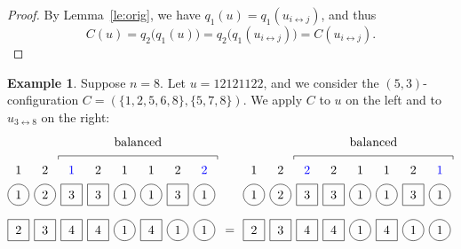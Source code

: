 \documentclass[reqno]{amsart}
\newcommand{\0}{\phantom{c}}
\theoremstyle{plain}
\theoremstyle{definition}
\newtheorem{example}[thm]{Example}
\numberwithin{equation}{section}
\begin{document}
\begin{proof}
  By Lemma~\ref{le:orig}, we have $q_1(u) = q_1(u_{i\leftrightarrow j})$, and thus
  \[
  C(u) = q_2\bigl( q_1(u) \bigr) = q_2\bigl( q_1(u_{i\leftrightarrow j}) \bigr) = C(u_{i\leftrightarrow j}).
  \]
\end{proof}

\begin{example}
Suppose $n = 8$.
Let $u = 12121122$, and we consider the $(5,3)$-configuration $C = (\{1,2,5,6,8\}, \{5,7,8\})$.
We apply $C$ to $u$ on the left and to $u_{3 \leftrightarrow 8}$ on the right:
\[
\begin{tikzpicture}[baseline=-3]
  \def\sc{0.75}   %
  \def\lll{1.7}   %
  \def\ll{1}   %
  \def\l{0}   %
  \node[color=blue] at (3*\sc,\lll) {$1$};
  \node[color=blue] at (8*\sc,\lll) {$2$};
  \foreach \i in {1,5,6} { \node at (\i*\sc,\lll) {$1$}; }
  \foreach \i in {2,4,7} { \node at (\i*\sc,\lll) {$2$}; }
  \foreach \i in {1,2,5,6,8} { \draw (\i*\sc,\ll) circle (0.3); }
  \foreach \i in {3,4,7} { \draw (\i*\sc-.3,\ll-.3) rectangle +(0.6,+0.6); }
  \foreach \i in {1,5,6,8} { \node at (\i*\sc,\ll) {$1$}; }
  \foreach \i in {2} { \node at (\i*\sc,\ll) {$2$}; }
  \foreach \i in {3,4,7} { \node at (\i*\sc,\ll) {$3$}; }
  \foreach \i in {5,7,8} { \draw (\i*\sc,\l) circle (0.3); }
  \foreach \i in {1,2,3,4,6} { \draw (\i*\sc-.3,\l-.3) rectangle +(0.6,+0.6); }
  \foreach \i in {3,4,6} { \node at (\i*\sc,\l) {$4$}; }
  \foreach \i in {2} { \node at (\i*\sc,\l) {$3$}; }
  \foreach \i in {1} { \node at (\i*\sc,\l) {$2$}; }
  \foreach \i in {5,7,8} { \node at (\i*\sc,\l) {$1$}; }
  \draw (2.5*\sc,2) -- (2.5*\sc,2.1) -- (8.5*\sc,2.1) -- (8.5*\sc,2);
  \node at (5.5*\sc,2.5) {balanced};
\end{tikzpicture}
\hspace{3pt} = \hspace{4pt}
\begin{tikzpicture}[baseline=-3]
  \def\sc{0.75}   %
  \def\lll{1.7}   %
  \def\ll{1}   %
  \def\l{0}   %
  \node[color=blue] at (8*\sc,\lll) {$1$};
  \node[color=blue] at (3*\sc,\lll) {$2$};
  \foreach \i in {1,5,6} { \node at (\i*\sc,\lll) {$1$}; }
  \foreach \i in {2,4,7} { \node at (\i*\sc,\lll) {$2$}; }
  \foreach \i in {1,2,5,6,8} { \draw (\i*\sc,\ll) circle (0.3); }
  \foreach \i in {3,4,7} { \draw (\i*\sc-.3,\ll-.3) rectangle +(0.6,+0.6); }
  \foreach \i in {1,5,6,8} { \node at (\i*\sc,\ll) {$1$}; }
  \foreach \i in {3,4,7} { \node at (\i*\sc,\ll) {$3$}; }
  \foreach \i in {2} { \node at (\i*\sc,\ll) {$2$}; }
  \foreach \i in {5,7,8} { \draw (\i*\sc,\l) circle (0.3); }
  \foreach \i in {1,2,3,4,6} { \draw (\i*\sc-.3,\l-.3) rectangle +(0.6,+0.6); }
  \foreach \i in {3,4,6} { \node at (\i*\sc,\l) {$4$}; }
  \foreach \i in {2} { \node at (\i*\sc,\l) {$3$}; }
  \foreach \i in {1} { \node at (\i*\sc,\l) {$2$}; }
  \foreach \i in {5,7,8} { \node at (\i*\sc,\l) {$1$}; }
  \draw (2.5*\sc,2) -- (2.5*\sc,2.1) -- (8.5*\sc,2.1) -- (8.5*\sc,2);
  \node at (5.5*\sc,2.5) {balanced};
\end{tikzpicture}
\]
\end{example}
\end{document}
